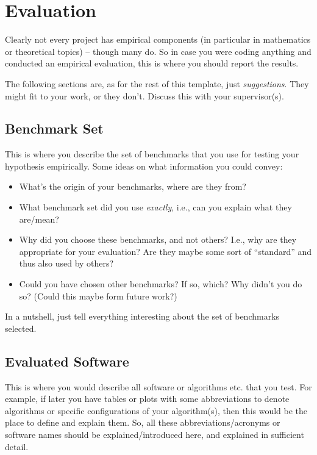 \chapter{Evaluation}\label{chap:evaluation}

Clearly not every project has empirical components (in particular in mathematics or theoretical topics) -- though many do. So in case you were coding anything and conducted an empirical evaluation, this is where you should report the results.

The following sections are, as for the rest of this template, just \emph{suggestions}. They might fit to your work, or they don't. Discuss this with your supervisor(s).


\section{Benchmark Set}

This is where you describe the set of benchmarks that you use for testing your hypothesis empirically. Some ideas on what information you could convey:

\begin{itemize}
  \item What's the origin of your benchmarks, where are they from?
  \item What benchmark set did you use \emph{exactly}, i.e., can you explain what they are/mean?
  \item Why did you choose these benchmarks, and not others? I.e., why are they appropriate for your evaluation? Are they maybe some sort of ``standard'' and thus also used by others?
  \item Could you have chosen other benchmarks? If so, which? Why didn't you do so? (Could this maybe form future work?)
\end{itemize}

In a nutshell, just tell everything interesting about the set of benchmarks selected.


\section{Evaluated Software}

This is where you would describe all software or algorithms etc. that you test. For example, if later you have tables or plots with some abbreviations to denote algorithms or specific configurations of your algorithm(s), then this would be the place to define and explain them. So, all these abbreviations/acronyms or software names should be explained/introduced here, and explained in sufficient detail.


